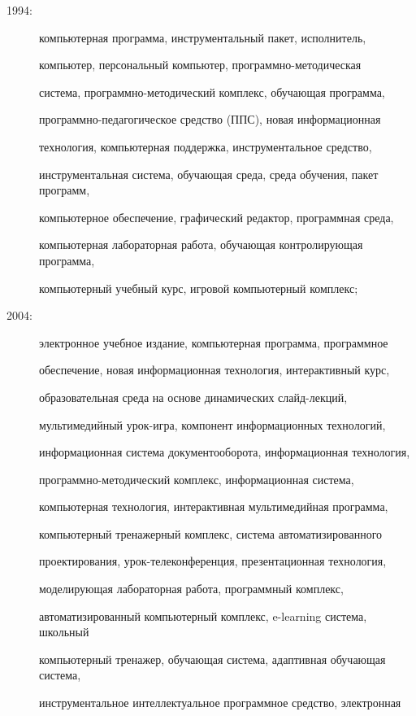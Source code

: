 \begin{description}

\item[1994:] компьютерная программа, инструментальный пакет, исполнитель,

компьютер, персональный компьютер, про\-грам\-мно-ме\-то\-ди\-че\-ская

система, програм\-мно-ме\-то\-ди\-че\-ский комплекс, обучающая программа,

про\-грам\-мно-пе\-да\-го\-ги\-че\-ское средство (ППС), новая информационная

технология, компь\-ютер\-ная поддержка, инструментальное средство,

инструментальная система, обучающая среда, среда обучения, пакет программ,

компьютерное обеспечение, графический редактор, программная среда,

компьютерная лабораторная работа, обучающая контролирующая программа,

компьютерный учебный курс, игровой компьютерный комплекс;



\item[2004:] электронное учебное издание, компьютерная программа, программное

обеспечение, новая информационная технология, интерактивный курс,

образовательная среда на основе динамических слайд-лек\-ций,

мультимедийный урок-иг\-ра, компонент информационных технологий,

информационная сис\-те\-ма документооборота, информационная технология,

про\-грам\-мно-ме\-то\-ди\-че\-ский комплекс, информационная сис\-те\-ма,

компьютерная технология, интерактивная мультимедийная программа,

компьютерный тренажерный \mbox{комплекс}, сис\-те\-ма автоматизированного

проектирования, урок-те\-ле\-кон\-фе\-рен\-ция, презентационная технология,

моделирующая лабораторная работа, программный комплекс,

автоматизированный компьютерный комплекс, \mbox{e-learning} сис\-те\-ма, школьный

компьютерный тренажер, обучающая сис\-те\-ма, адаптивная обучающая сис\-те\-ма,

инструментальное интеллектуальное программное средство, электронная


\end{description}
